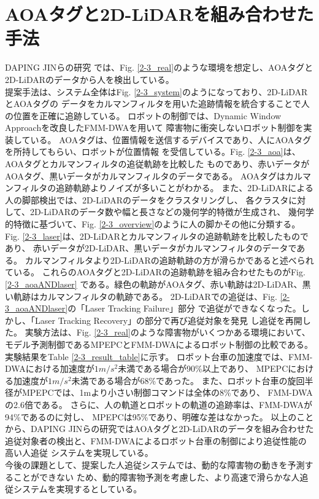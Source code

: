 \section{AOAタグと2D-LiDARを組み合わせた手法}
DAPING JINらの研究\cite{A Robust Autonomous Following Method for Mobile Robots in Dynamic Environments}
では、Fig. \ref{2-3_real}のような環境を想定し、AOAタグと2D-LiDARのデータから人を検出している。\\ \indent
提案手法は、システム全体はFig. \ref{2-3_system}のようになっており、2D-LiDARとAOAタグの
データをカルマンフィルタを用いた追跡情報を統合することで人の位置を正確に追跡している。
ロボットの制御では、Dynamic Window Approachを改良したFMM-DWAを用いて
障害物に衝突しないロボット制御を実装している。
AOAタグは、位置情報を送信するデバイスであり、人にAOAタグを所持してもらい、ロボットが位置情報
を受信している。Fig. \ref{2-3_aoa}は、AOAタグとカルマンフィルタの追従軌跡を比較した
ものであり、赤いデータがAOAタグ、黒いデータがカルマンフィルタのデータである。
AOAタグはカルマンフィルタの追跡軌跡よりノイズが多いことがわかる。
また、2D-LiDARによる人の脚部検出では、2D-LiDARのデータをクラスタリングし、
各クラスタに対して、2D-LiDARのデータ数や幅と長さなどの幾何学的特徴が生成され、
幾何学的特徴に基づいて、Fig. \ref{2-3_overview}のように人の脚かその他に分類する。
Fig. \ref{2-3_laser}は、2D-LiDARとカルマンフィルタの追跡軌跡を比較したものであり、
赤いデータが2D-LiDAR、黒いデータがカルマンフィルタのデータである。
カルマンフィルタより2D-LiDARの追跡軌跡の方が滑らかであると述べられている。
これらのAOAタグと2D-LiDARの追跡軌跡を組み合わせたものがFig. \ref{2-3_aoaANDlaser}
である。緑色の軌跡がAOAタグ、赤い軌跡は2D-LiDAR、黒い軌跡はカルマンフィルタの軌跡である。
2D-LiDARでの追従は、Fig. \ref{2-3_aoaANDlaser}の「Laser Tracking Failure」部分
で追従ができなくなった。しかし、「Laser Tracking Recovery」の部分で再び追従対象を発見
し追従を再開した。
実験方法は、Fig. \ref{2-3_real}のような障害物がいくつかある環境において、
モデル予測制御であるMPEPCとFMM-DWAによるロボット制御の比較である。
実験結果をTable \ref{2-3_result_table}に示す。
ロボット台車の加速度では、FMM-DWAにおける加速度が$1m/s^2$未満である場合が90\%以上であり、
MPEPCにおける加速度が$1m/s^2$未満である場合が68\%であった。
また、ロボット台車の旋回半径がMPEPCでは、1mより小さい制御コマンドは全体の8\%であり、
FMM-DWAの2.6倍である。
さらに、人の軌道とロボットの軌道の追跡率は、FMM-DWAが94\%であるのに対し、
MPEPCは95\%であり、明確な差はなかった。
以上のことから、DAPING JINらの研究ではAOAタグと2D-LiDARのデータを組み合わせた
追従対象者の検出と、FMM-DWAによるロボット台車の制御により追従性能の高い人追従
システムを実現している。\\ \indent
今後の課題として、提案した人追従システムでは、動的な障害物の動きを予測することができない
ため、動的障害物予測を考慮した、より高速で滑らかな人追従システムを実現するとしている。

